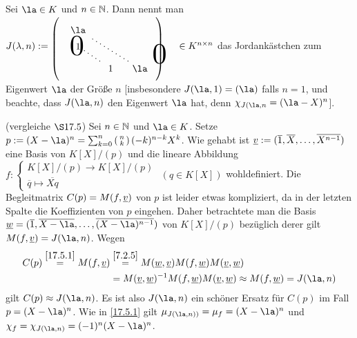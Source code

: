 \documentclass[../../main.tex]{subfiles}
\begin{document}
\begin{df}\label{17.7.1}
Sei $\la\in K$ und $n\in \mathbb N$. Dann nennt man\\ $J(\lambda, n):=\begin{tikzpicture}[loosely dotted,thick,baseline]
\matrix (m) [matrix of math nodes,nodes in empty cells,right delimiter=),left delimiter=(,column sep=1em]{
\tikz\node(a){$\la$};&&\\
1\\
\\
&\tikz\node(b){$1$};&\la\\
} ;
\draw (m-1-1)-- (m-4-3);
\draw (m-2-1)-- (m-4-2);
\node[scale=3, xshift=0.5cm, yshift=-0.1cm] at (a.east) {$0$};
\node[scale=3, xshift=-0.3cm, yshift=0.0cm] at (b.west) {$0$};
\end{tikzpicture}\in K^{n\times n}$ das Jordankästchen zum Eigenwert $\la$ der Größe $n$ [insbesondere $J(\la,1)=(\la)$ falls $n=1$, und beachte, dass $J(\la,n)$ den Eigenwert $\la$ hat, denn $\chi_{J(\la, n}=(\la-X)^n$].
\end{df}

\begin{bem}
(vergleiche $\S 17.5$) Sei $n\in \mathbb N$ und $\la\in K$. Setze $p:=(X-\la)^n=\sum_{k=0}^n\cvec{n\\k}(-k)^{n-k}X^k$. Wie gehabt ist ${\underline v}:=(\overline{1}, \overline{X},\ldots ,\overline{X^{n-1}})$ eine Basis von $K[X]/(p)$ und die lineare Abbildung $f:\begin{cases}K[X]/(p)\to K[X]/(p)\\ \overline{q}\mapsto \overline{Xq}\end{cases}$ $(q\in K[X])$ wohldefiniert. Die Begleitmatrix $C(p)=M(f,{\underline v})$ von $p$ ist leider etwas kompliziert, da in der letzten Spalte die Koeffizienten von $p$ eingehen. Daher betrachtete man die Basis $\w=(\overline{1},\overline{X-\la},\ldots ,\overline{(X-\la)^{n-1}})$ von $K[X]/(p)$ bezüglich derer gilt $M(f,\v)=J(\la,n)$. Wegen
\begin{align*}
C(p)\stackrel{\ref{17.5.1}}{=}M(f,\v)&\stackrel{\ref{7.2.5}}{=}M(\w,\v)M(f,\w)M(\v,\w)\\
&=M(\v,\w)^{-1}M(f,\w)M(\v,\w)\approx M(f,\w)=J(\la, n)
\end{align*}
gilt $C(p)\approx J(\la,n)$. Es ist also $J(\la,n)$ ein schöner Ersatz für $C(p)$ im Fall $p=(X-\la)^n$. Wie in \ref{17.5.1} gilt $\mu_{J(\la,n))}=\mu_f=(X-\la)^n$ und $\chi_f=\chi_{J(\la,n)}=(-1)^n(X-\la)^n$.
\end{bem}
\end{document}
